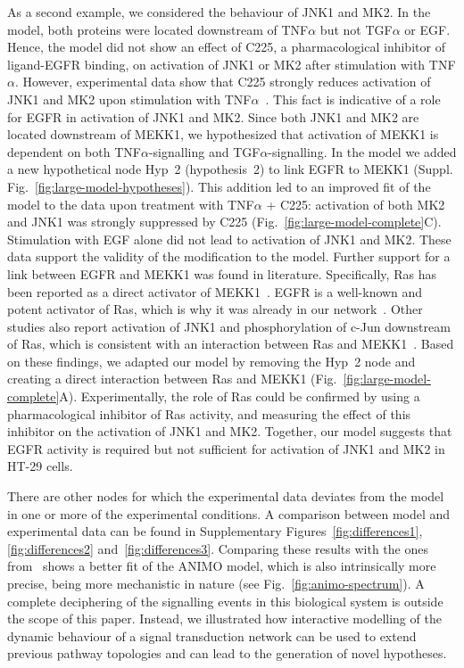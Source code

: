 \documentclass{bmcart}
\begin{document}
As a second example, we considered the behaviour of JNK1 and MK2. In the model, both
proteins were located downstream of TNF$\alpha$ but not TGF$\alpha$ or EGF. Hence, the
model did not show an effect of C225, a pharmacological inhibitor of ligand-EGFR
binding, on activation of JNK1 or MK2 after stimulation with TNF$\alpha$. However, experimental
data show that C225 strongly reduces activation of JNK1 and MK2 upon stimulation with
TNF$\alpha$~\cite{pathway-autocrine}.
This fact is indicative of a role for EGFR in activation of JNK1 and MK2. Since both JNK1 and MK2
are located downstream of MEKK1, we hypothesized that activation
of MEKK1 is dependent on
both TNF$\alpha$-signalling and TGF$\alpha$-signalling. In the model we added a new
hypothetical node {\sf Hyp~2} (hypothesis~2) to link EGFR to MEKK1 (Suppl. Fig.~\ref{fig:large-model-hypotheses}).
This addition led to an improved fit of the model to the data upon treatment with TNF$\alpha$ + C225:
activation of both MK2 and JNK1 was strongly suppressed by C225 (Fig.~\ref{fig:large-model-complete}C).
Stimulation with EGF alone did not lead to activation of JNK1 and MK2.
These data support the validity of the modification to the model.
Further support for a link between EGFR and MEKK1 was found in literature. Specifically,
Ras has been reported as a direct activator of
MEKK1~\cite{ras-mekk1}. EGFR is a well-known and potent activator of Ras,
which is why it was already in our network~\cite{kegg}.
Other studies also report activation of JNK1 and phosphorylation of c-Jun downstream of Ras, which is consistent with
an interaction between Ras and MEKK1~\cite{cfos-cjun,ras-jnk1}.
Based on these findings, we adapted
our model by removing the {\sf Hyp~2} node and creating a direct interaction between Ras
and MEKK1 (Fig.~\ref{fig:large-model-complete}A). Experimentally, the role of Ras could be confirmed by using a
pharmacological inhibitor of Ras activity, and measuring the effect of this inhibitor on the activation of JNK1 and MK2.
Together, our model suggests that EGFR activity is required
but not sufficient for activation of JNK1 and MK2 in HT-29 cells.


There are other nodes for which the experimental data deviates from the model in one or more of the experimental conditions.
A comparison between model and experimental data can be found in Supplementary Figures~\ref{fig:differences1}, \ref{fig:differences2} and~\ref{fig:differences3}.
Comparing these results with the ones from~\cite{pathway-fuzzy} shows a better fit of the ANIMO model, which is also intrinsically
more precise, being more mechanistic in nature (see Fig.~\ref{fig:animo-spectrum}).
A complete deciphering of the signalling events
in this biological system is outside the scope of this paper. Instead, we illustrated how interactive modelling of the dynamic behaviour
of a signal transduction network can be used to extend previous pathway topologies and can lead to the generation of novel hypotheses.
\end{document}
